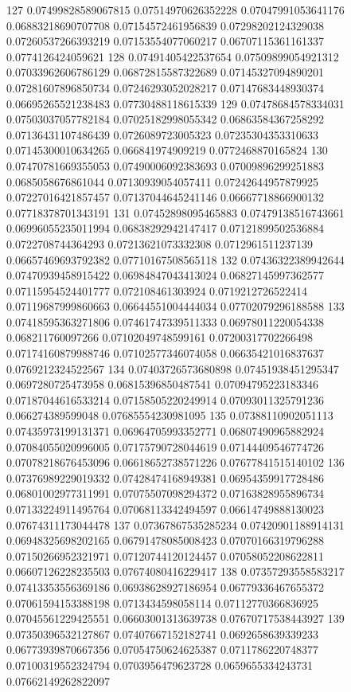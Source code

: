 127 0.07499828589067815 0.07514970626352228 0.07047991053641176 0.06883218690707708 0.07154572461956839 0.07298202124329038 0.07260537266393219 0.07153554077060217 0.06707115361161337 0.0774126424059621
128 0.07491405422537654 0.07509899054921312 0.07033962606786129 0.06872815587322689 0.07145327094890201 0.07281607896850734 0.07246293052028217 0.07147683448930374 0.06695265521238483 0.07730488118615339
129 0.07478684578334031 0.07503037057782184 0.07025182998055342 0.06863584367258292 0.07136431107486439 0.0726089723005323 0.07235304353310633 0.07145300010634265 0.066841974909219 0.0772468870165824
130 0.07470781669355053 0.07490006092383693 0.07009896299251883 0.0685058676861044 0.07130939054057411 0.07242644957879925 0.07227016421857457 0.07137044645241146 0.06667718866900132 0.07718378701343191
131 0.07452898095465883 0.07479138516743661 0.06996055235011994 0.06838292942147417 0.07121899502536884 0.0722708744364293 0.07213621073332308 0.0712961511237139 0.06657469693792382 0.07710167508565118
132 0.07436322389942644 0.07470939458915422 0.06984847043413024 0.06827145997362577 0.07115954524401777 0.072108461303924 0.0719212726522414 0.07119687999860663 0.06644551004444034 0.07702079296188588
133 0.07418595363271806 0.07461747339511333 0.06978011220054338 0.068211760097266 0.07102049748599161 0.07200317702266498 0.07174160879988746 0.07102577346074058 0.06635421016837637 0.0769212324522567
134 0.07403726573680898 0.07451938451295347 0.0697280725473958 0.06815396850487541 0.07094795223183346 0.07187044616533214 0.07158505220249914 0.07093011325791236 0.066274389599048 0.07685554230981095
135 0.07388110902051113 0.07435973199131371 0.06964705993352771 0.06807490965882924 0.07084055020996005 0.07175790728044619 0.07144409546774726 0.07078218676453096 0.06618652738571226 0.07677841515140102
136 0.07376989229019332 0.07428474168949381 0.06954359917728486 0.06801002977311991 0.07075507098294372 0.07163828955896734 0.07133224911495764 0.07068113342494597 0.06614749888130023 0.07674311173044478
137 0.07367867535285234 0.07420901188914131 0.06948325698202165 0.06791478085008423 0.07070166319796288 0.07150266952321971 0.07120744120124457 0.07058052208622811 0.06607126228235503 0.07674080416229417
138 0.07357293558583217 0.07413353556369186 0.06938628927186954 0.06779336467655372 0.07061594153388198 0.0713434598058114 0.07112770366836925 0.07045561229425551 0.06603001313639738 0.07670717538443927
139 0.07350396532127867 0.07407667152182741 0.0692658639339233 0.06773939870667356 0.07054750624625387 0.0711786220748377 0.07100319552324794 0.0703956479623728 0.0659655334243731 0.07662149262822097
